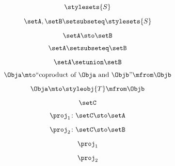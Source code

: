 \begin{forslides}
    \begin{equation}
        \label{eq:combination-144}
        \stylesets{S}
    \end{equation}

    \begin{equation}
        \label{eq:combination-145}
        \setA,\setB\setsubseteq \stylesets{S}
    \end{equation}

    \begin{equation}
        \label{eq:combination-146}
        \setA \sto \setB
    \end{equation}

    \begin{equation}
        \label{eq:combination-147}
        \setA\setsubseteq \setB
    \end{equation}

    \begin{equation}
        \label{eq:combination-148}
        \setA\setunion\setB
    \end{equation}

    \begin{equation}
        \label{eq:combination-149}
        \Obja \mto \text{``coproduct of } \Obja \text{ and } \Objb \text{''}  \mfrom \Objb
    \end{equation}

    \begin{equation}
        \label{eq:combination-150}
        \Obja \mto \styleobj{T} \mfrom \Objb
    \end{equation}

    \begin{equation}
        \label{eq:combination-151}
        \setC
    \end{equation}

    \begin{equation}
        \label{eq:combination-152}
        \proj_1\colon \setC \sto \setA
    \end{equation}

    \begin{equation}
        \label{eq:combination-153}
        \proj_2\colon \setC \sto \setB
    \end{equation}

    \begin{equation}
        \label{eq:combination-154}
        \proj_1
    \end{equation}

    \begin{equation}
        \label{eq:combination-155}
        \proj_2
    \end{equation}


\end{forslides}
